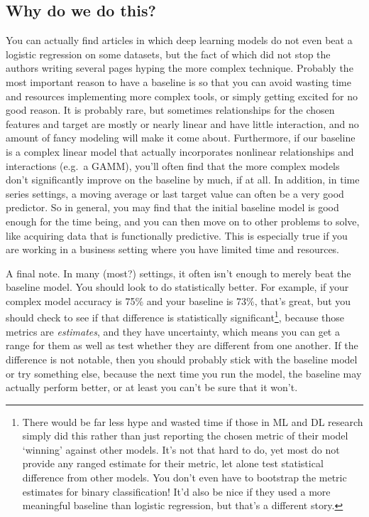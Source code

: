 \documentclass[
  letterpaper,
]{krantz}
\begin{document}
\subsection{Why do we do this?}\label{why-do-we-do-this}

You can actually find articles in which deep learning models do not even
beat a logistic regression on some datasets, but the fact of which did
not stop the authors writing several pages hyping the more complex
technique. Probably the most important reason to have a baseline is so
that you can avoid wasting time and resources implementing more complex
tools, or simply getting excited for no good reason. It is probably
rare, but sometimes relationships for the chosen features and target are
mostly or nearly linear and have little interaction, and no amount of
fancy modeling will make it come about. Furthermore, if our baseline is
a complex linear model that actually incorporates nonlinear
relationships and interactions (e.g.~a GAMM), you'll often find that the
more complex models don't significantly improve on the baseline by much,
if at all. In addition, in time series settings, a moving average or
last target value can often be a very good predictor. So in general, you
may find that the initial baseline model is good enough for the time
being, and you can then move on to other problems to solve, like
acquiring data that is functionally predictive. This is especially true
if you are working in a business setting where you have limited time and
resources.

A final note. In many (most?) settings, it often isn't enough to merely
beat the baseline model. You should look to do statistically better. For
example, if your complex model accuracy is 75\% and your baseline is
73\%, that's great, but you should check to see if that difference is
statistically significant\footnote{There would be far less hype and
  wasted time if those in ML and DL research simply did this rather than
  just reporting the chosen metric of their model `winning' against
  other models. It's not that hard to do, yet most do not provide any
  ranged estimate for their metric, let alone test statistical
  difference from other models. You don't even have to bootstrap the
  metric estimates for binary classification! It'd also be nice if they
  used a more meaningful baseline than logistic regression, but that's a
  different story.}, because those metrics are \emph{estimates}, and
they have uncertainty, which means you can get a range for them as well
as test whether they are different from one another. If the difference
is not notable, then you should probably stick with the baseline model
or try something else, because the next time you run the model, the
baseline may actually perform better, or at least you can't be sure that
it won't.
\end{document}
